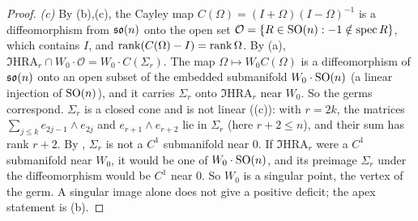\begin{proof}
\emph{(c)} By (b),(c), the Cayley map $C(\Omega)=(I+\Omega)(I-\Omega)^{-1}$ is a diffeomorphism from $\mathfrak{so}(n)$
onto the open set $\mathcal O=\{R\in\mathrm{SO}(n):-1\notin\operatorname{spec}R\}$, which contains $I$, and
$\operatorname{rank}(C(\Omega)-I)=\operatorname{rank}\Omega$. By (a), $\Im\mathrm{HRA}_r\cap W_0\cdot\mathcal O=W_0\cdot C(\Sigma_r)$. The map
$\Omega\mapsto W_0C(\Omega)$ is a diffeomorphism of $\mathfrak{so}(n)$ onto an open subset of the embedded submanifold
$W_0\cdot\mathrm{SO}(n)$ (a linear injection of $\mathrm{SO}(n)$), and it carries $\Sigma_r$ onto $\Im\mathrm{HRA}_r$ near $W_0$. So the
germs correspond. $\Sigma_r$ is a closed cone and is not linear ((c)): with $r=2k$, the matrices
$\sum_{j\le k}e_{2j-1}\wedge e_{2j}$ and $e_{r+1}\wedge e_{r+2}$ lie in $\Sigma_r$ (here $r+2\le n$), and their sum has rank
$r+2$. By , $\Sigma_r$ is not a $C^1$ submanifold near $0$. If $\Im\mathrm{HRA}_r$ were a $C^1$ submanifold near
$W_0$, it would be one of $W_0\cdot\mathrm{SO}(n)$, and its preimage $\Sigma_r$ under the diffeomorphism would be $C^1$ near $0$.
So $W_0$ is a singular point, the vertex of the germ. A singular image alone does not give a positive deficit; the apex
statement is (b).


\end{proof}
